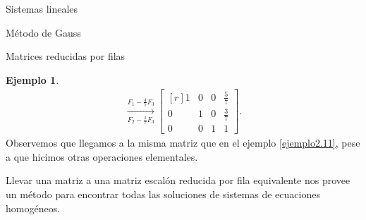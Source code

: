\documentclass[a4paper,12pt,twoside,spanish,reqno]{amsbook}
\theoremstyle{definition}
\newtheorem{ejemplo}{Ejemplo}[section]
\theoremstyle{remark}
\begin{document}
\begin{chapter}{Sistemas lineales}
\begin{section}{Método de Gauss }
\begin{subsection}{Matrices reducidas por filas}
\begin{ejemplo}
\begin{multline*}
                    \underset{F_2-\frac17F_3}{\stackrel{F_1 -\frac47 F_3}{\longrightarrow}} 
                    \begin{bmatrix*}[r] 1& 0&0& \frac{5}7 \\ 0&1 &0&\frac37 \\ 0&0&1&1 \end{bmatrix*}.
                    \end{multline*}
                    Observemos que llegamos a la misma matriz que en el ejemplo \ref{ejemplo2.11}, pese a que hicimos otras operaciones elementales.
                \end{ejemplo}
                

                
            
                
    
                
                Llevar una matriz a una matriz  escalón reducida por fila equivalente nos provee un método para encontrar todas las soluciones de sistemas de ecuaciones homogéneos.
                

\end{subsection}
\end{section}
\end{chapter}
\end{document}
